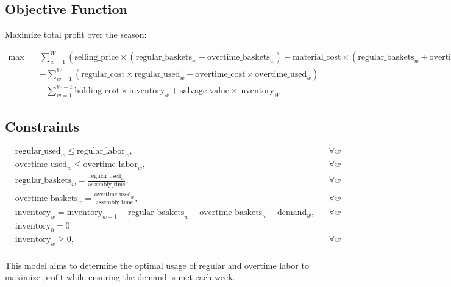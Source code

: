 \documentclass{article}
\begin{document}
\subsection*{Objective Function}
Maximize total profit over the season:

\[
\begin{aligned}
\max \quad & \sum_{w=1}^{W} \left( \text{selling\_price} \times (\text{regular\_baskets}_w + \text{overtime\_baskets}_w) - \text{material\_cost} \times (\text{regular\_baskets}_w + \text{overtime\_baskets}_w) \right) \\
& - \sum_{w=1}^{W} \left( \text{regular\_cost} \times \text{regular\_used}_w + \text{overtime\_cost} \times \text{overtime\_used}_w \right) \\
& - \sum_{w=1}^{W-1} \text{holding\_cost} \times \text{inventory}_w + \text{salvage\_value} \times \text{inventory}_W
\end{aligned}
\]

\subsection*{Constraints}

\[
\begin{aligned}
& \text{regular\_used}_w \leq \text{regular\_labor}_w, && \forall w \\
& \text{overtime\_used}_w \leq \text{overtime\_labor}_w, && \forall w \\
& \text{regular\_baskets}_w = \frac{\text{regular\_used}_w}{\text{assembly\_time}}, && \forall w \\
& \text{overtime\_baskets}_w = \frac{\text{overtime\_used}_w}{\text{assembly\_time}}, && \forall w \\
& \text{inventory}_w = \text{inventory}_{w-1} + \text{regular\_baskets}_w + \text{overtime\_baskets}_w - \text{demand}_w, && \forall w \\
& \text{inventory}_0 = 0 \\
& \text{inventory}_w \geq 0, && \forall w \\
\end{aligned}
\]

This model aims to determine the optimal usage of regular and overtime labor to maximize profit while ensuring the demand is met each week.
\end{document}
